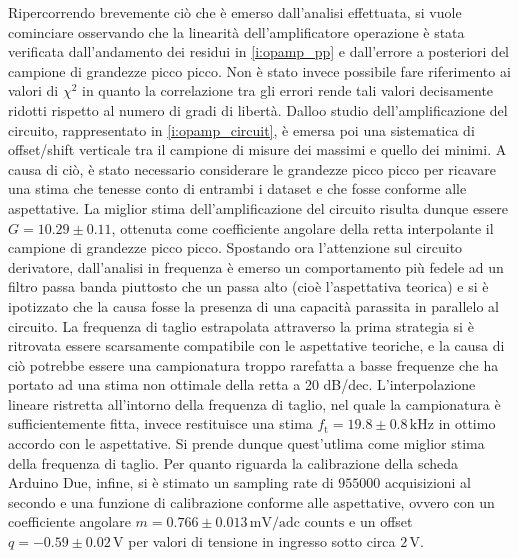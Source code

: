 \documentclass[a4paper,11pt]{article} %
\begin{document}
Ripercorrendo brevemente ciò che è emerso dall'analisi effettuata, si vuole cominciare osservando che la linearità
dell'amplificatore operazione è stata verificata dall'andamento dei residui in \autoref{i:opamp_pp} e dall'errore a
posteriori del campione di grandezze picco picco. Non è stato invece possibile fare riferimento ai valori di $\chi^2$ in
quanto la correlazione tra gli errori rende tali valori decisamente ridotti rispetto al numero di gradi di libertà.
Dalloo studio dell'amplificazione del circuito, rappresentato in \autoref{i:opamp_circuit}, è emersa poi una sistematica
di offset/shift verticale tra il campione di misure dei massimi e quello dei minimi. A causa di ciò, è stato necessario
considerare le grandezze picco picco per ricavare una stima che tenesse conto di entrambi i dataset e che fosse conforme
alle aspettative. La miglior stima dell'amplificazione del circuito risulta dunque essere $G=10.29 \pm 0.11$, ottenuta
come coefficiente angolare della retta interpolante il campione di grandezze picco picco. Spostando ora l'attenzione sul
circuito derivatore, dall'analisi in frequenza è emerso un comportamento più fedele ad un filtro passa banda piuttosto
che un passa alto (cioè l'aspettativa teorica) e si è ipotizzato che la causa fosse la presenza di una capacità
parassita in parallelo al circuito. La frequenza di taglio estrapolata attraverso la prima strategia si è ritrovata
essere scarsamente compatibile con le aspettative teoriche, e la causa di ciò potrebbe essere una campionatura troppo
rarefatta a basse frequenze che ha portato ad una stima non ottimale della retta a 20 dB/dec. L'interpolazione lineare
ristretta all'intorno della frequenza di taglio, nel quale la campionatura è sufficientemente fitta, invece restituisce
una stima $f_{\text{t}}=19.8 \pm 0.8\,\si{\kHz}$ in ottimo accordo con le aspettative. Si prende dunque quest'utlima
come miglior stima della frequenza di taglio. Per quanto riguarda la calibrazione della scheda Arduino Due, infine, si è
stimato un sampling rate di $955000$ acquisizioni al secondo e una funzione di calibrazione conforme alle aspettative,
ovvero con un coefficiente angolare $m=0.766\pm 0.013\,\text{mV/adc counts}$ e un offset $q=-0.59\pm0.02\,\si{\volt}$
per valori di tensione in ingresso sotto circa $2\,\si{\volt}$.


\end{document}
